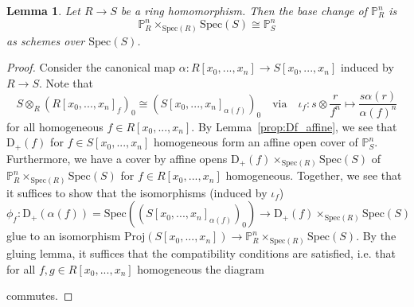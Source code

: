 \documentclass{scrartcl}
\newcommand{\D}[1]{\mathrm{D}_+(#1)}
\renewcommand{\P}{\mathbb{P}}
\newcommand{\Spec}{\mathrm{Spec}}
\newcommand{\Proj}{\mathrm{Proj}}
\newtheorem{lemma}[subsection]{Lemma}
\theoremstyle{definition}
\begin{document}
\begin{lemma}
    \label{prop:projective_space_base_change}
    Let $R \to S$ be a ring homomorphism.
    Then the base change of $\P_R^n$ is
    \begin{equation*}
        \P_R^n \times_{\Spec(R)} \Spec(S) \cong \P_S^n
    \end{equation*}
    as schemes over $\Spec(S)$.
\end{lemma}
\begin{proof}
    Consider the canonical map $\alpha: R[x_0, ..., x_n] \to S[x_0, ..., x_n]$ induced by $R \to S$.
    Note that
    \begin{equation*}
        S \otimes_R (R[x_0, ..., x_n]_f)_0 \cong (S[x_0, ..., x_n]_{\alpha(f)})_0 \quad \text{via} \quad \iota_f: s \otimes \frac r {f^n} \mapsto \frac {s\alpha(r)} {\alpha(f)^n}
    \end{equation*}
    for all homogeneous $f \in R[x_0, ..., x_n]$.
    By Lemma~\ref{prop:Df_affine}, we see that $\D{f}$ for $f \in S[x_0, ..., x_n]$ homogeneous form an affine open cover of $\P_S^n$.
    Furthermore, we have a cover by affine opens $\D{f} \times_{\Spec(R)} \Spec(S)$ of $\P_R^n \times_{\Spec(R)} \Spec(S)$ for $f \in R[x_0, ..., x_n]$ homogeneous.
    Together, we see that it suffices to show that the isomorphisms (induced by $\iota_f$)
    \begin{equation*}
        \phi_f: \D{\alpha(f)} = \Spec((S[x_0, ..., x_n]_{\alpha(f)})_0) \to \D{f} \times_{\Spec(R)} \Spec(S)
    \end{equation*}
    glue to an isomorphism $\Proj(S[x_0, ..., x_n]) \to \P_R^n \times_{\Spec(R)} \Spec(S)$.
    By the gluing lemma, it suffices that the compatibility conditions are satisfied, i.e. that for all $f, g \in R[x_0, ..., x_n]$ homogeneous the diagram
    \begin{center}
    \end{center}
    commutes.


\end{proof}
\end{document}
